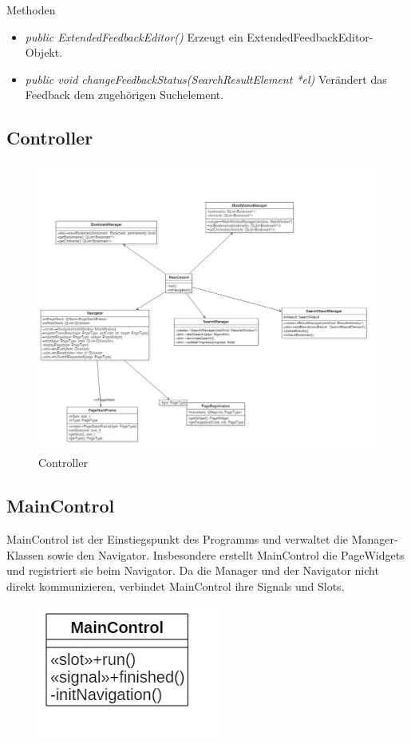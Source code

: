 Methoden
\begin{itemize}
	\item\textit{public ExtendedFeedbackEditor()}
	Erzeugt ein ExtendedFeedbackEditor-Objekt.
	\item\textit{public void changeFeedbackStatus(SearchResultElement *el)}
	Verändert das Feedback dem zugehörigen Suchelement.
\end{itemize}

\pagebreak

\subsection{Controller}

\begin{figure}[H]
\includegraphics[width=1\linewidth]{img/Klassendiagramm/Controller}
\caption{Controller}
\label{fig:controller}
\end{figure}


\subsection*{MainControl}
MainControl ist der Einstiegspunkt des Programms und verwaltet die Manager-Klassen sowie den Navigator. Insbesondere erstellt MainControl die PageWidgets und registriert sie beim Navigator.
Da die Manager und der Navigator nicht direkt kommunizieren, verbindet MainControl ihre Signals und Slots.

\begin{figure}[H]
\centering
\includegraphics[scale=0.5]{img/Klassendiagramm/Klassen/Controller/MainControl}
\label{fig:mainControl}
\end{figure}

